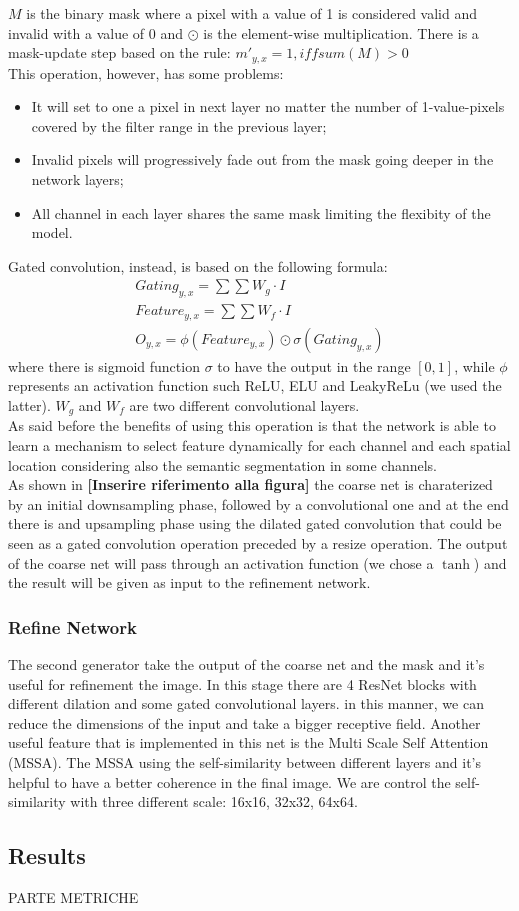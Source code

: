 \documentclass[10pt,twocolumn,letterpaper]{article}
\begin{document}
	\(M\) is the binary mask where a pixel with a value of 1 is considered valid and invalid with a value of 0 and \(\odot\) is the element-wise multiplication.
	There is a mask-update step based on the rule: \(m'_{y,x} = 1, iff sum(M) > 0\)
	\\
	This operation, however, has some problems:
	\begin{itemize}
		\item 
		It will set to one a pixel in next layer no matter the number of 1-value-pixels covered by the filter range in the previous layer;
		\item
		Invalid pixels will progressively fade out from the mask going deeper in the network layers;
		\item
		All channel in each layer shares the same mask limiting the flexibity of the model.
	\end{itemize}
	Gated convolution, instead, is based on the following formula:
	\begin{gather}
		Gating_{y,x} = \sum \sum W_g \cdot I \\
		Feature_{y,x} = \sum \sum W_f \cdot I \\
		O_{y,x} = \phi (Feature_{y,x}) \odot \sigma (Gating_{y,x})
	\end{gather}
	where there is sigmoid function \(\sigma\) to have the output in the range \([0,1]\), while \(\phi\) represents an activation function such ReLU, ELU and LeakyReLu (we used the latter). \(W_g\) and \(W_f\) are two different convolutional layers.
	\\
	As said before the benefits of using this operation is that the network is able to learn a mechanism to select feature dynamically for each channel and each spatial location considering also the semantic segmentation in some channels.
	\\
	As shown in \textbf{[Inserire riferimento alla figura]} the coarse net is charaterized by an initial downsampling phase, followed by a convolutional one and at the end there is and upsampling phase using the dilated gated convolution that could be seen as a gated convolution operation preceded by a resize operation. The output of the coarse net will pass through an activation function (we chose a \(\tanh\)) and the result will be given as input to the refinement network.
	\subsubsection{Refine Network}
	The second generator take the output of the coarse net and the mask and it's useful for refinement the image.
	In this stage there are 4 ResNet blocks with different dilation and some gated convolutional layers. in this manner, we can reduce the dimensions of the input and take a bigger receptive field. Another useful feature that is implemented in this net is the Multi Scale Self Attention (MSSA). The MSSA using the self-similarity between different layers and it's helpful to have a better coherence in the final image. We are control the self-similarity with three different scale: 16x16, 32x32, 64x64.
	
	
	\subsection{Results}
	PARTE METRICHE
	
	
	{\small
		
		
	}
	
\end{document}
